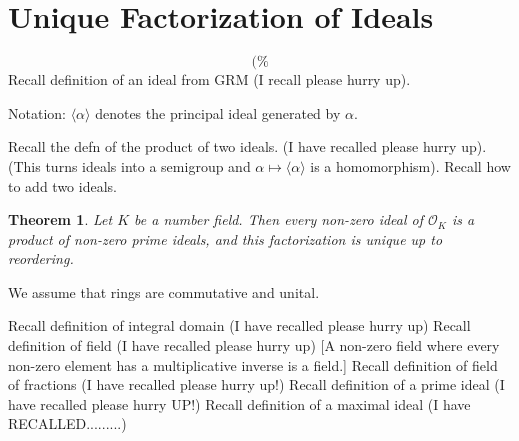 \documentclass{article}
\theoremstyle{definition}
\theoremstyle{remark}
\theoremstyle{plain}
\newtheorem{thm}[defn]{Theorem}
\begin{document}
\section{Unique Factorization of Ideals}
\[(\%\tag{Owen's Signature}\]
Recall definition of an ideal from GRM (I recall please hurry up).

Notation: $\langle\alpha\rangle$ denotes the principal ideal generated by $\alpha$.

Recall the defn of the product of two ideals. (I have recalled please hurry up). (This turns ideals into a semigroup and $\alpha\mapsto\langle\alpha\rangle$ is a homomorphism). Recall how to add two ideals.

\begin{thm}
    Let $K$ be a number field. Then every non-zero ideal of $\mathcal O_K$ is a product of non-zero prime ideals, and this factorization is unique up to reordering.
\end{thm}
We assume that rings are commutative and unital.

Recall definition of integral domain (I have recalled please hurry up)
Recall definition of field (I have recalled please hurry up) [A non-zero field where every non-zero element has a multiplicative inverse is a field.]
Recall definition of field of fractions (I have recalled please hurry up!)
Recall definition of a prime ideal (I have recalled please hurry UP!)
Recall definition of a maximal ideal (I have RECALLED.........)
\end{document}
